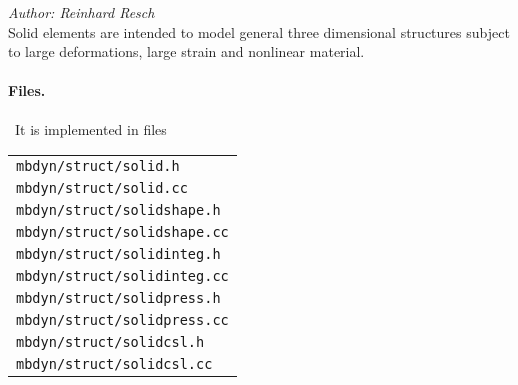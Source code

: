%
%
%
%
%
%
%
%
\emph{Author: Reinhard Resch} \\
Solid elements are intended to model general three dimensional structures subject to large deformations, large strain and nonlinear material.
\paragraph{Files.} \
It is implemented in files\\
\begin{tabular}{l}
\texttt{mbdyn/struct/solid.h} \\
\texttt{mbdyn/struct/solid.cc} \\
\texttt{mbdyn/struct/solidshape.h} \\
\texttt{mbdyn/struct/solidshape.cc} \\
\texttt{mbdyn/struct/solidinteg.h} \\
\texttt{mbdyn/struct/solidinteg.cc} \\
\texttt{mbdyn/struct/solidpress.h} \\
\texttt{mbdyn/struct/solidpress.cc} \\
\texttt{mbdyn/struct/solidcsl.h} \\
\texttt{mbdyn/struct/solidcsl.cc}
\end{tabular}
